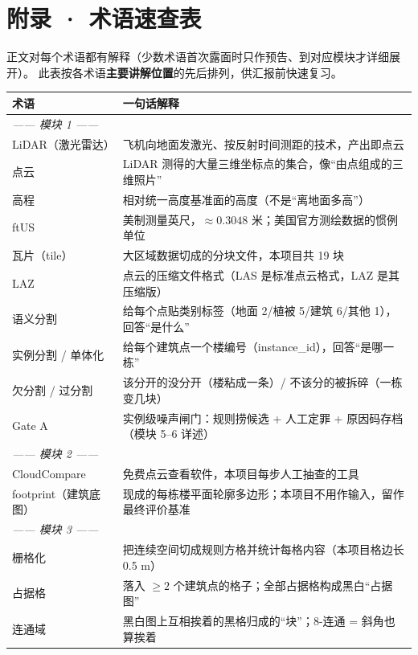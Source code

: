 \section*{附录 · 术语速查表}

正文对每个术语都有解释（少数术语首次露面时只作预告、到对应模块才详细展开）。
此表按各术语\textbf{主要讲解位置}的先后排列，供汇报前快速复习。

\begin{center}
\small
\begin{tabular}{p{3.4cm}p{11.2cm}}
\toprule
术语 & 一句话解释 \\
\midrule
\multicolumn{2}{l}{\emph{—— 模块 1 ——}} \\
LiDAR（激光雷达） & 飞机向地面发激光、按反射时间测距的技术，产出即点云 \\
点云 & LiDAR 测得的大量三维坐标点的集合，像``由点组成的三维照片'' \\
高程 & 相对统一高度基准面的高度（不是``离地面多高''） \\
ftUS & 美制测量英尺，$\approx0.3048$ 米；美国官方测绘数据的惯例单位 \\
瓦片（tile） & 大区域数据切成的分块文件，本项目共 19 块 \\
LAZ & 点云的压缩文件格式（LAS 是标准点云格式，LAZ 是其压缩版） \\
语义分割 & 给每个点贴类别标签（地面 2/植被 5/建筑 6/其他 1），回答``是什么'' \\
实例分割 / 单体化 & 给每个建筑点一个楼编号（instance\_id），回答``是哪一栋'' \\
欠分割 / 过分割 & 该分开的没分开（楼粘成一条）/ 不该分的被拆碎（一栋变几块） \\
Gate A & 实例级噪声闸门：规则捞候选 + 人工定罪 + 原因码存档（模块 5--6 详述） \\
\multicolumn{2}{l}{\emph{—— 模块 2 ——}} \\
CloudCompare & 免费点云查看软件，本项目每步人工抽查的工具 \\
footprint（建筑底图） & 现成的每栋楼平面轮廓多边形；本项目不用作输入，留作最终评价基准 \\
\multicolumn{2}{l}{\emph{—— 模块 3 ——}} \\
栅格化 & 把连续空间切成规则方格并统计每格内容（本项目格边长 0.5 m） \\
占据格 & 落入 $\geq2$ 个建筑点的格子；全部占据格构成黑白``占据图'' \\
连通域 & 黑白图上互相挨着的黑格归成的``块''；8-连通 = 斜角也算挨着 \\

\end{tabular}
\end{center}
